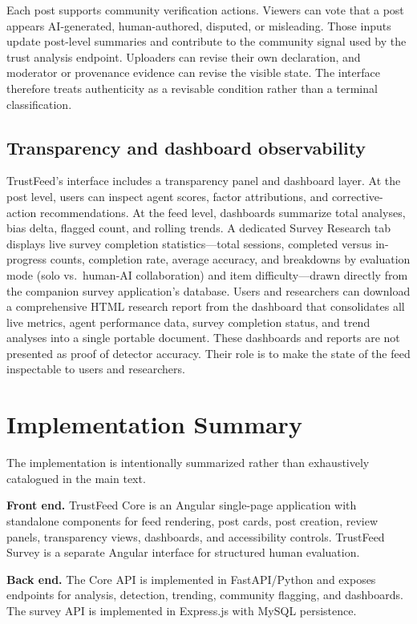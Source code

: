 \documentclass[acmlarge,screen,nonacm]{acmart}
\begin{document}
Each post supports community verification actions. Viewers can vote that a post appears AI-generated, human-authored, disputed, or misleading. Those inputs update post-level summaries and contribute to the community signal used by the trust analysis endpoint. Uploaders can revise their own declaration, and moderator or provenance evidence can revise the visible state. The interface therefore treats authenticity as a revisable condition rather than a terminal classification.

\subsection{Transparency and dashboard observability}

TrustFeed's interface includes a transparency panel and dashboard layer. At the post level, users can inspect agent scores, factor attributions, and corrective-action recommendations. At the feed level, dashboards summarize total analyses, bias delta, flagged count, and rolling trends. A dedicated Survey Research tab displays live survey completion statistics---total sessions, completed versus in-progress counts, completion rate, average accuracy, and breakdowns by evaluation mode (solo vs.\ human-AI collaboration) and item difficulty---drawn directly from the companion survey application's database. Users and researchers can download a comprehensive HTML research report from the dashboard that consolidates all live metrics, agent performance data, survey completion status, and trend analyses into a single portable document. These dashboards and reports are not presented as proof of detector accuracy. Their role is to make the state of the feed inspectable to users and researchers.

\section{Implementation Summary}

The implementation is intentionally summarized rather than exhaustively catalogued in the main text.

\textbf{Front end.} TrustFeed Core is an Angular single-page application with standalone components for feed rendering, post cards, post creation, review panels, transparency views, dashboards, and accessibility controls. TrustFeed Survey is a separate Angular interface for structured human evaluation.

\textbf{Back end.} The Core API is implemented in FastAPI/Python and exposes endpoints for analysis, detection, trending, community flagging, and dashboards. The survey API is implemented in Express.js with MySQL persistence.
\end{document}
